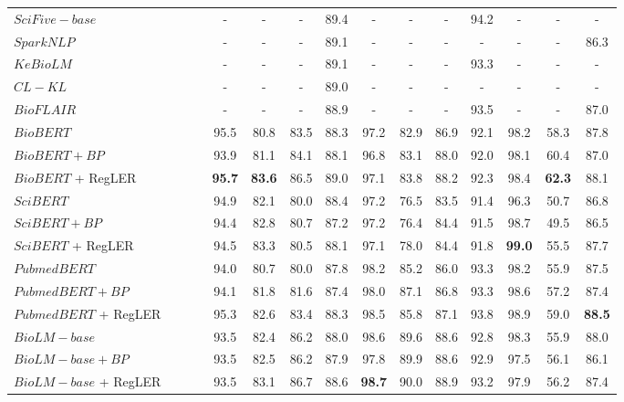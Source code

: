 \documentclass[11pt]{article}
\newcommand{\cmark}{\ding{51}}\newcommand{\xmark}{\ding{55}}\newcommand{\cross}{\ding{61}}\newcommand{\mb}[1]{\textcolor{red}{#1}}
\begin{document}
\begin{table*}[t]
\begin{adjustbox}{width=\textwidth}
\begin{tabular}{ l c c c c c c c | c c c c | c c c }
$SciFive-base$ \cross & \xmark & \xmark & \xmark & - & - & - & 89.4 & - & - & - & 94.2 & - & - & - \\
$Spark NLP$ \cross & \xmark & \xmark & \xmark & - & - & - & 89.1 & - & - & - & - & - & - & 86.3  \\
$KeBioLM$ \cross & \xmark & \xmark & \xmark & - & - & - & 89.1 & - & - & - & 93.3 & - & - & -  \\
$CL-KL$ \cross & \xmark & \xmark & \xmark & - & - & - & 89.0 & - & - & - & - & - & - & -  \\
$BioFLAIR$ \cross & \xmark & \xmark & \xmark & - & - & - & 88.9 & - & - & - & 93.5 & - & - & 87.0 \\
\midrule
$BioBERT$  & \xmark & \xmark & \xmark & 95.5 & 80.8 & 83.5 & 88.3 &  97.2 & 82.9 & 86.9 & 92.1 & 98.2 & 58.3 & 87.8 \\
$BioBERT + {BP}$ & \xmark & \xmark & \xmark & 93.9 & 81.1 & 84.1 & 88.1 & 96.8 & 83.1 & 88.0 & 92.0 & 98.1 & 60.4 & 87.0 \\ 
$BioBERT$ + RegLER & \cmark & \cmark & \cmark & \textbf{95.7} & \textbf{83.6} & 86.5 & 89.0 & 97.1 & 83.8 & 88.2 & 92.3 & 98.4 & \textbf{62.3} & 88.1 \\ \midrule
$SciBERT$ & \xmark & \xmark & \xmark & 94.9 & 82.1 & 80.0 & 88.4 & 97.2 & 76.5 & 83.5 & 91.4 & 96.3 & 50.7 & 86.8 \\
$SciBERT + {BP}$ & \xmark & \xmark & \xmark & 94.4 & 82.8 & 80.7 & 87.2 & 97.2 & 76.4 & 84.4 & 91.5 & 98.7 & 49.5 & 86.5 \\
$SciBERT$ + RegLER & \cmark & \cmark & \cmark & 94.5 & 83.3 & 80.5 & 88.1 & 97.1 & 78.0 & 84.4 & 91.8 & \textbf{99.0} & 55.5 & 87.7 \\ \midrule
$PubmedBERT$ & \xmark & \xmark & \xmark & 94.0 & 80.7 & 80.0 & 87.8 & 98.2 & 85.2 & 86.0 & 93.3 & 98.2 & 55.9 & 87.5 \\
$PubmedBERT + {BP}$ & \xmark & \xmark & \xmark & 94.1 & 81.8 & 81.6 & 87.4 & 98.0 & 87.1 & 86.8 & 93.3 & 98.6 & 57.2 & 87.4 \\
$PubmedBERT$ + RegLER & \cmark & \cmark & \cmark& 95.3 & 82.6 & 83.4 & 88.3 & 98.5 & 85.8 & 87.1 & 93.8 & 98.9 & 59.0 & \textbf{88.5} \\ \midrule
$BioLM-base$ & \xmark & \xmark & \xmark & 93.5 & 82.4 & 86.2 & 88.0 & 98.6 & 89.6 & 88.6 & 92.8 & 98.3 & 55.9 & 88.0 \\
$BioLM-base + {BP}$ & \xmark & \xmark & \xmark & 93.5 & 82.5 & 86.2 & 87.9 & 97.8 & 89.9 & 88.6 & 92.9 & 97.5 & 56.1 & 86.1 \\
$BioLM-base$ + RegLER & \cmark & \cmark & \cmark & 93.5 & 83.1 & 86.7 &  88.6 & \textbf{98.7} & 90.0 & 88.9 & 93.2 & 97.9 & 56.2 & 87.4 \\

\end{tabular}
\end{adjustbox}
\end{table*}
\end{document}
